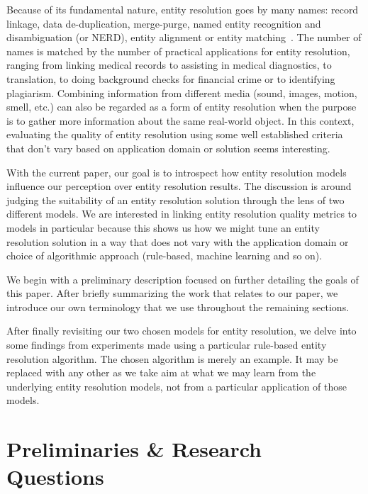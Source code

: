 \documentclass[journal]{IEEEtran}
\begin{document}
    Because of its fundamental nature, entity resolution goes by many names:
    record linkage, data de-duplication, merge-purge, named entity recognition
    and disambiguation (or NERD), entity alignment or entity matching~\cite{Tal11,fever2009,alhelbawy2014}.
    The number of names is matched by the number of practical applications for
    entity resolution, ranging from linking medical records to assisting in
    medical diagnostics, to translation, to doing background checks for
    financial crime or to identifying plagiarism.
    Combining information from different media (sound, images, motion, smell,
    etc.) can also be regarded as a form of entity resolution when the purpose
    is to gather more information about the same real-world object.
    In this context, evaluating the quality of entity resolution using some well
    established criteria that don't vary based on application domain or solution
    seems interesting.

    With the current paper, our goal is to introspect how entity resolution
    models influence our perception over entity resolution results.
    The discussion is around judging the suitability of an entity resolution
    solution through the lens of two different models.
    We are interested in linking entity resolution quality metrics to models
    in particular because this shows us how we might tune an entity resolution
    solution in a way that does not vary with the application domain or choice
    of algorithmic approach (rule-based, machine learning and so on).
    
    We begin with a preliminary description focused on further detailing the
    goals of this paper.
    After briefly summarizing the work that relates to our paper, we introduce
    our own terminology that we use throughout the remaining sections.
    
    After finally revisiting our two chosen models for entity resolution, we
    delve into some findings from experiments made using a particular rule-based
    entity resolution algorithm.
    The chosen algorithm is merely an example. It may be replaced with any other
    as we take aim at what we may learn from the underlying entity resolution
    models, not from a particular application of those models.

    \section{Preliminaries \& Research Questions}\label{sec:Preliminaries & Questions}
    
\end{document}
